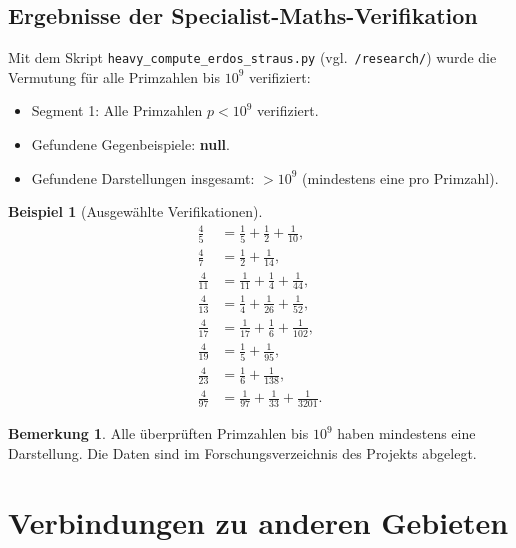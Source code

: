 \documentclass[12pt,a4paper]{amsart}
\theoremstyle{definition}
\newtheorem{example}[theorem]{Beispiel}
\newtheorem{remark}[theorem]{Bemerkung}
\begin{document}
\subsection{Ergebnisse der Specialist-Maths-Verifikation}

Mit dem Skript \texttt{heavy\_compute\_erdos\_straus.py} (vgl.\
\texttt{/research/}) wurde die Vermutung für alle Primzahlen bis $10^9$
verifiziert:

\begin{itemize}
\item Segment 1: Alle Primzahlen $p < 10^9$ verifiziert.
\item Gefundene Gegenbeispiele: \textbf{null}.
\item Gefundene Darstellungen insgesamt: $> 10^9$ (mindestens eine pro Primzahl).
\end{itemize}

\begin{example}[Ausgewählte Verifikationen]
\begin{align*}
  \frac{4}{5} &= \frac{1}{5} + \frac{1}{2} + \frac{1}{10}, \\[4pt]
  \frac{4}{7} &= \frac{1}{2} + \frac{1}{14}, \\[4pt]
  \frac{4}{11} &= \frac{1}{11} + \frac{1}{4} + \frac{1}{44}, \\[4pt]
  \frac{4}{13} &= \frac{1}{4} + \frac{1}{26} + \frac{1}{52}, \\[4pt]
  \frac{4}{17} &= \frac{1}{17} + \frac{1}{6} + \frac{1}{102}, \\[4pt]
  \frac{4}{19} &= \frac{1}{5} + \frac{1}{95}, \\[4pt]
  \frac{4}{23} &= \frac{1}{6} + \frac{1}{138}, \\[4pt]
  \frac{4}{97} &= \frac{1}{97} + \frac{1}{33} + \frac{1}{3201}.
\end{align*}
\end{example}

\begin{remark}
Alle überprüften Primzahlen bis $10^9$ haben mindestens eine Darstellung.
Die Daten sind im Forschungsverzeichnis des Projekts abgelegt.
\end{remark}

\section{Verbindungen zu anderen Gebieten}
\end{document}
